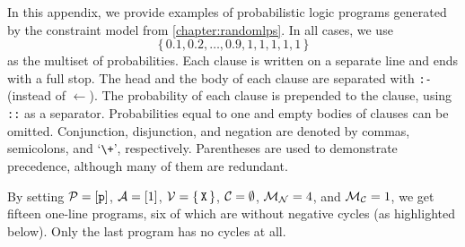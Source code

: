 In this appendix, we provide examples of probabilistic logic programs generated
by the constraint model from \cref{chapter:randomlps}. In all cases, we use
\[
  \{\, 0.1, 0.2, \dots, 0.9, 1, 1, 1, 1, 1 \,\}
\]
as the multiset of probabilities. Each clause is written on a separate line and
ends with a full stop. The head and the body of each clause are separated with
\texttt{:-} (instead of $\gets$). The probability of each clause is prepended to
the clause, using \texttt{::} as a separator. Probabilities equal to one and
empty bodies of clauses can be omitted. Conjunction, disjunction, and negation
are denoted by commas, semicolons, and `\texttt{\textbackslash+}', respectively.
Parentheses are used to demonstrate precedence, although many of them are
redundant.

By setting $\mathcal{P}{} = [\texttt{p}]$, $\mathcal{A}{} = [1]$, $\mathcal{V}{} =
\{\, \texttt{X} \,\}$, $\mathcal{C}{} = \emptyset$, $\mathcal{M}_{\mathcal{N}}{} = 4$, and
$\mathcal{M}_{\mathcal{C}}{} = 1$, we get fifteen one-line programs, six of which are
without negative cycles (as highlighted below). Only the last program has no
cycles at all.

